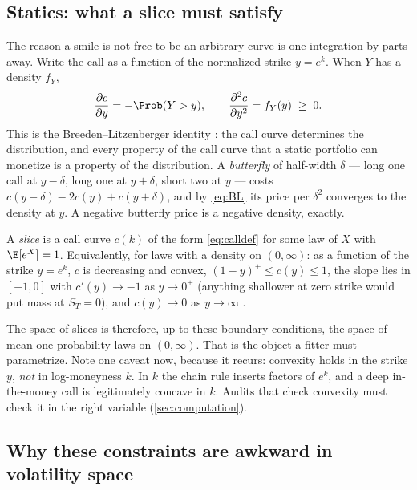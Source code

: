 \subsection{Statics: what a slice must satisfy}

The reason a smile is not free to be an arbitrary curve is one integration
by parts away.  Write the call as a function of the normalized strike
$y=e^{k}$.  When $Y$ has a density $f_Y$,
\begin{equation}
\frac{\partial c}{\partial y}=-\Prob(Y>y),
\qquad
\frac{\partial^{2}c}{\partial y^{2}}=f_Y(y)\;\ge\;0 .
\label{eq:BL}
\end{equation}
This is the Breeden--Litzenberger identity
\citep{BreedenLitzenberger1978}: the call curve determines the
distribution, and every property of the call curve that a static portfolio
can monetize is a property of the distribution.  A \emph{butterfly} of
half-width $\delta$ --- long one call at $y-\delta$, long one at
$y+\delta$, short two at $y$ --- costs
$c(y-\delta)-2c(y)+c(y+\delta)$, and by \eqref{eq:BL} its price per
$\delta^{2}$ converges to the density at $y$.  A negative butterfly
price is a negative density, exactly.

\begin{definition}
\label{def:slice}
A \emph{slice} is a call curve $c(k)$ of the form \eqref{eq:calldef} for
some law of $X$ with $\E[e^{X}]=1$.  Equivalently, for laws with a density
on $(0,\infty)$: as a function of the strike $y=e^{k}$, $c$ is decreasing
and convex, $(1-y)^{+}\le c(y)\le 1$, the slope lies in $[-1,0]$ with
$c'(y)\to-1$ as $y\to0^{+}$ (anything shallower at zero strike would put
mass at $S_T=0$), and $c(y)\to0$ as $y\to\infty$
\citep{CarrMadan2005}.
\end{definition}

The space of slices is therefore, up to these boundary conditions, the
space of mean-one probability laws on $(0,\infty)$.  That is the object a
fitter must parametrize.  Note one caveat now, because it recurs: convexity
holds in the strike $y$, \emph{not} in log-moneyness $k$.  In $k$ the
chain rule inserts factors of $e^{k}$, and a deep in-the-money call is
legitimately concave in $k$.  Audits that check convexity must check it in
the right variable (\cref{sec:computation}).

\subsection{Why these constraints are awkward in volatility space}

